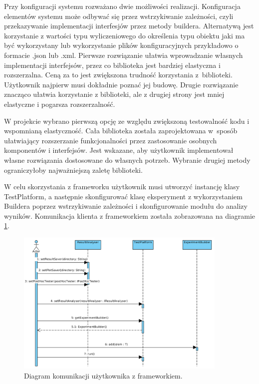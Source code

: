 \documentclass[12pt]{article}
\begin{document}
Przy konfiguracji systemu rozważano dwie możliwości realizacji. Konfiguracja elementów systemu może odbywać się przez wstrzykiwanie zależności, czyli przekazywanie implementacji interfesjów przez metody buildera. Alternatywą jest korzystanie z wartości typu wyliczeniowego do określenia typu obiektu jaki ma być wykorzystany lub wykorzystanie plików konfiguracyjnych przykładowo o formacie .json lub .xml. Pierwsze rozwiązanie ułatwia wprowadzanie własnych implementacji interfejsów, przez co biblioteka jest bardziej elastyczna i rozszerzalna. Ceną za to jest zwiększona trudność korzystania z~biblioteki. Użytkownik najpierw musi dokładnie poznać jej budowę. Drugie rozwiązanie znacząco ułatwia korzystanie z biblioteki, ale z drugiej strony jest mniej elastyczne i pogarsza rozszerzalność. 

W projekcie wybrano pierwszą opcję ze względu zwiększoną testowalność kodu i wspomnianą elastyczność. Cała biblioteka została zaprojektowana w~sposób ułatwiający rozszerzanie funkcjonalności przez zastosowanie osobnych komponentów i interfejsów. Jest wskazane, aby użytkownik implementował własne rozwiązania dostosowane do własnych potrzeb. Wybranie drugiej metody ograniczyłoby najważniejszą zaletę biblioteki.

W celu skorzystania z frameworku użytkownik musi utworzyć instancję klasy TestPlatform, a następnie skonfigurować klasę eksperyment z wykorzystaniem Buildera poprzez wstrzykiwanie zależności i skonfigurowanie modułu do analizy wyników. Komunikacja klienta z frameworkiem została zobrazowana na diagramie \ref{fig:sequenceUser}.

\begin{figure}
	\centering
	\includegraphics[width=0.9\textwidth]{img/sequenceUser.png}
	\caption{Diagram komunikacji użytkownika z frameworkiem.}
	\label{fig:sequenceUser}
\end{figure}
\end{document}
